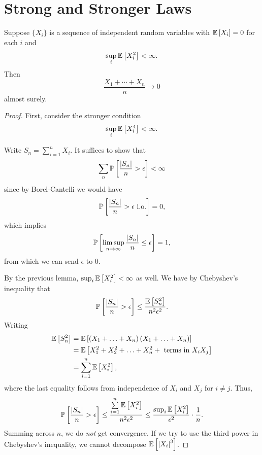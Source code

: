 \section{Strong and Stronger Laws}

\begin{theorem}
	Suppose $\{X_i\}$ is a sequence of independent random variables with $\E\left[X_i\right] = 0$ for each $i$ and
	\[
		\sup_i \E\left[X_i^2\right] < \infty
	.\]
	Then
	\[
		\frac{X_1+\cdots+X_n}{n} \to 0
	\]
	almost surely.
\end{theorem}

\begin{proof}
	First, consider the stronger condition
	\[
		\sup_i \E\left[X_i^4\right] < \infty
	.\]

	Write $S_n = \sum_{i=1}^{n}X_i$. It suffices to show that \[
		\sum_{n}^{} \P\left[\frac{\left| S_n \right|}{n} > \epsilon\right] < \infty
	\] since by Borel-Cantelli we would have \[
		\P\left[\frac{\left| S_n \right|}{n} > \epsilon \text{ i.o.}\right] = 0
	,\] which implies \[
		\P\left[\limsup\limits_{n \to \infty} \frac{\left| S_n \right|}{n} \le \epsilon\right] = 1
	,\] from which we can send $\epsilon$ to $0$.

	By the previous lemma, $\sup_i \E\left[X_i^2\right] < \infty$ as well. We have by Chebyshev's inequality that \[
		\P\left[\frac{\left| S_n \right|}{n} > \epsilon\right] \le \frac{\E\left[S_n^2\right] }{n^2\epsilon^2}
	.\] Writing 
	\begin{align*}
		\E\left[S_n^2\right]
		&= \E\left[\left( X_1+\ldots+X_n \right)\left( X_1+\ldots+X_n \right)\right] \\
		&= \E\left[X_1^2 + X_2^2 + \ldots+ X_n^2 + \text{ terms in $X_i X_j$}\right] \\
		&= \sum\limits_{i=1}^{n} \E\left[X_i^2\right]
	,\end{align*}
	where the last equality follows from independence of $X_i$ and $X_j$ for $i \ne j$.
	Thus, \[
		\P\left[\frac{\left| S_n \right|}{n} > \epsilon\right]
		\le \frac{\sum\limits_{i=1}^{n} \E\left[X_i^2\right] }{n^2\epsilon^2}
		\le \frac{\sup_i \E\left[X_i^2\right] }{\epsilon^2} \cdot  \frac{1}{n}
	.\] Summing across $n$, we do \emph{not} get convergence. If we try to use the third power in Chebyshev's inequality, we cannot decompose $\E\left[\left| X_i \right|^3\right] $.


\end{proof}
